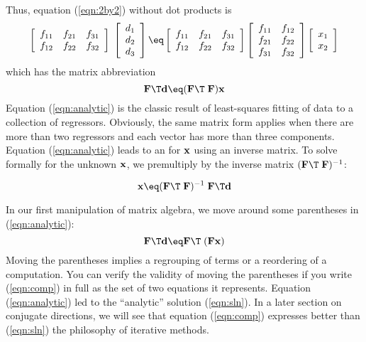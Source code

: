 Thus, equation (\ref{eqn:2by2}) without dot products is
\begin{equation}
\left[ 
\begin{array}{ccc}
  f_{11} & f_{21} & f_{31}  \\
  f_{12} & f_{22} & f_{32}  \end{array} \right] 
\; \left[ 
\begin{array}{c}
  d_1 \\ 
  d_2 \\ 
  d_3 \end{array} \right]
\eq
\left[ 
\begin{array}{ccc}
  f_{11} & f_{21} & f_{31}  \\
  f_{12} & f_{22} & f_{32}  \end{array} \right] 
\left[ 
\begin{array}{ccc}
  f_{11} & f_{12}  \\
  f_{21} & f_{22}  \\
  f_{31} & f_{32}  \end{array} \right] 
\left[ 
\begin{array}{ccc}
  x_1  \\
  x_2  \end{array} \right] 
\end{equation}
which has the matrix abbreviation
\begin{equation}
\bold F\T \dd \eq ( \bold F\T \; \bold F )  \bold x
\label{eqn:analytic}
\end{equation}
Equation
(\ref{eqn:analytic})
is the classic result of least-squares
fitting of data to a collection of regressors.
Obviously, the same matrix form applies when there are more than
two regressors and each vector has more than three components.
Equation
(\ref{eqn:analytic})
leads to an  for $\bold x$
using an inverse matrix.
To solve formally for the unknown $\bold x$,
we premultiply by the inverse matrix $( \bold F\T \; \bold F )^{-1}$:

\par
\begin{equation}
\bold x \eq
( \bold F\T \; \bold F )^{-1} \;
\bold F\T \dd 
\label{eqn:sln}
\end{equation}

\par
In our first manipulation of matrix algebra,
we move around some parentheses in 
(\ref{eqn:analytic}):
\begin{equation}
\bold F\T \dd \eq  \bold F\T \; (\bold F   \bold x )
\label{eqn:comp}
\end{equation}
Moving the parentheses implies a regrouping of terms
or a reordering of a computation.
You can verify the validity of moving the parentheses
if you write (\ref{eqn:comp}) in full as the set of two equations it represents.
Equation
(\ref{eqn:analytic})
led to the ``analytic'' solution (\ref{eqn:sln}).
In a later section on conjugate directions,
we will see that equation
(\ref{eqn:comp})
expresses better than
(\ref{eqn:sln})
the philosophy of iterative methods.

